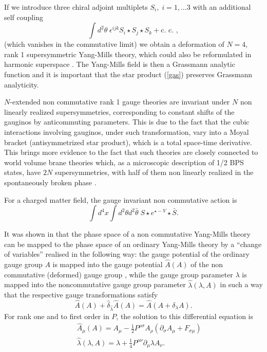 \documentclass[a4paper,12pt]{article}
\begin{document}
If we introduce three chiral adjoint multiplets $S_i,\; i=1,\dots 3$
with an additional  self coupling
$$
\int d^2\theta \;\epsilon^{ijk}S_i\star S_j\star S_k +\mbox{c. c. },
$$
(which vanishes in the commutative limit) we obtain a deformation of
$N=4$, rank 
1 supersymmetric Yang-Mills theory, which could also be reformulated in
harmonic superspace \cite{ka, hw}.
The Yang-Mills field is then a Grassmann analytic function \cite{gikos,
fs} 
and it is important that the star product 
(\ref{gas}) preserves Grassmann analyticity.

 $N$-extended non commutative rank 1 gauge theories are invariant under
$N$ non linearly 
realized supersymmetries, corresponding to constant shifts of the gauginos
by anticommuting
 parameters. This is due to the fact that the  cubic interactions involving
gauginos, under such 
transformation, vary into a Moyal bracket (antisymmetrized star product),
which is a total 
space-time derivative. This brings more evidence to the fact that such
theories 
are closely connected to world volume brane theories which, as a
microscopic 
description of 1/2 BPS states, have $2N$ supersymmetries, with half of
them 
non linearly realized in the  spontaneously broken phase \cite{bg, t}.

For a charged matter field, the gauge invariant non commutative action is
$$
\int d^4x \int d^2\theta d^2\bar\theta\; S\star e^{\star -V}\star\bar S.
$$

\bigskip

It was shown in \cite{sw} that the phase space of a non commutative
Yang-Mills theory 
can be mapped to the phase space of an ordinary Yang-Mills theory by a
``change of variables''
realised in the following way: the gauge potential of the ordinary gauge
group 
$A$ is mapped into the gauge potential $\hat A (A)$ 
of the non commutative (deformed) gauge group , while the gauge group
parameter $\lambda$
 is mapped into the 
noncommutative gauge group parameter $\hat \lambda(\lambda, A)$ in such a
way that the 
respective gauge transformations satisfy
$$
\hat A(A) +\hat\delta_{\hat\lambda}\hat A(A)=\hat A(A+\delta_\lambda A).
$$
For rank one and to first order in $P$, the solution to this differential
equation is \cite{sw}
\begin{eqnarray}
&&\hat A_\mu(A)=A_\mu -\frac{1}{2}P^{\rho\sigma}A_\rho(\partial_\sigma
A_\mu +F_{\sigma\mu})\nonumber\\
&&\hat\lambda(\lambda, A)=\lambda+\frac{1}{4}P^{\mu\nu}\partial_\mu\lambda
A_\nu.
\label{cv}
\end{eqnarray} 
\end{document}

